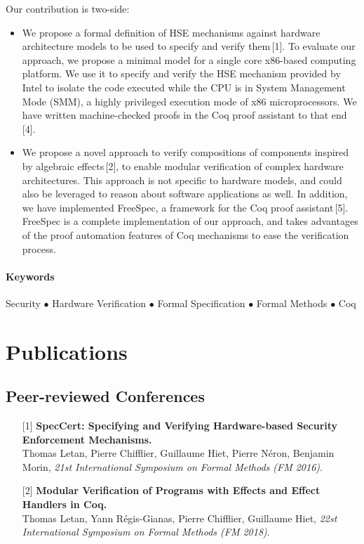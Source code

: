 \documentclass{article}
\begin{document}
Our contribution is two-side:
%
\begin{itemize}
\item We propose a formal definition of HSE mechanisms against hardware
  architecture models to be used to specify and verify them\,[1].
  To evaluate our approach, we propose a minimal model for a single core
  x86-based computing platform.
  We use it to specify and verify the HSE mechanism provided by Intel to isolate
  the code executed while the CPU is in System Management Mode (SMM), a highly
  privileged execution mode of x86 microprocessors.
  We have written machine-checked proofs in the Coq proof assistant to that
  end\,[4].
\item We propose a novel approach to verify compositions of components inspired
  by algebraic effects\,[2], to enable modular verification of complex hardware
  architectures.
  This approach is not specific to hardware models, and could also be leveraged
  to reason about software applications as well.
  In addition, we have implemented FreeSpec, a framework for the Coq proof
  assistant\,[5].
  FreeSpec is a complete implementation of our approach, and takes advantages of
  the proof automation features of Coq mechanisms to ease the verification
  process.
\end{itemize}

\paragraph{Keywords}
%
Security $\bullet$ Hardware Verification $\bullet$ Formal Specification
$\bullet$ Formal Methods $\bullet$ Coq

\section{Publications}

\subsection{Peer-reviewed Conferences}

\begin{itemize}
\item[] [1] \textbf{SpecCert: Specifying and Verifying Hardware-based Security
    Enforcement
    Mechanisms.} \\
  Thomas Letan, Pierre Chifflier, Guillaume Hiet, Pierre Néron, Benjamin Morin,
  \emph{21st International Symposium on Formal Methods (FM 2016)}.
\item[] [2] \textbf{Modular Verification of Programs with Effects and Effect
    Handlers in Coq.} \\
  Thomas Letan, Yann Régis-Gianas, Pierre Chifflier, Guillaume Hiet, \emph{22st
    International Symposium on Formal Methods (FM 2018)}.
\end{itemize}
\end{document}
